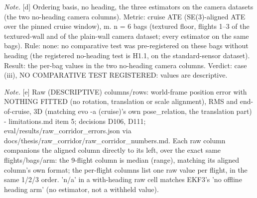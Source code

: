 \begin{table}[htbp]
\textit{Note.} [d] Ordering basis, no heading, the three estimators on the camera datasets (the two no-heading camera columns). Metric: cruise ATE (SE(3)-aligned ATE over the pinned cruise window), m. n = 6 bags (textured floor, flights 1--3 of the textured-wall and of the plain-wall camera dataset; every estimator on the same bags). Rule: none: no comparative test was pre-registered on these bags without heading (the registered no-heading test is H1.1, on the standard-sensor dataset). Result: the per-bag values in the two no-heading camera columns. Verdict: case (iii), NO COMPARATIVE TEST REGISTERED: values are descriptive.\par
\textit{Note.} [e] Raw (DESCRIPTIVE) columns/rows: world-frame position error with NOTHING FITTED (no rotation, translation or scale alignment), RMS and end-of-cruise, 3D (matching evo -a (cruise)'s own pose\_relation, the translation part) - limitations.md item 5; decisions D106, D111; eval/results/raw\_corridor\_errors.json via docs/thesis/raw\_corridor/raw\_corridor\_numbers.md. Each raw column companions the aligned column directly to its left, over the exact same flights/bags/arm: the 9-flight column is median (range), matching its aligned column's own format; the per-flight columns list one raw value per flight, in the same 1/2/3 order. 'n/a' in a with-heading raw cell matches EKF3's 'no offline heading arm' (no estimator, not a withheld value).\par
\end{table}
